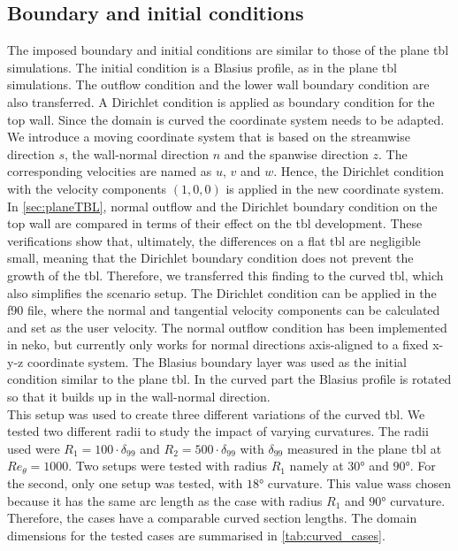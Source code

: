 \subsection{Boundary and initial conditions}
The imposed boundary and initial conditions are similar to those of the plane \acrshort{tbl} simulations.
The initial condition is  a Blasius profile, as in the plane \acrshort{tbl} simulations.
The outflow condition and the lower wall boundary condition  are also transferred.
A Dirichlet condition is applied as boundary condition for the top wall.
Since the domain is curved the coordinate system needs to be adapted.
We introduce a moving coordinate system that is based on the streamwise direction $s$, the wall-normal direction $n$ and the spanwise direction $z$.
The corresponding velocities are named as $u$, $v$ and $w$.
Hence, the Dirichlet condition with the velocity components $(1,0,0)$ is applied in the new coordinate system.
In \autoref{sec:planeTBL}, normal outflow and the Dirichlet  boundary condition on the top wall are compared  in terms of their effect on the \acrshort{tbl} development.
These verifications show that, ultimately, the differences  on a flat \acrshort{tbl} are negligible small, meaning that the Dirichlet boundary condition does not prevent the growth of the \acrshort{tbl}.
Therefore, we transferred this finding to the curved \acrshort{tbl}, which also simplifies the scenario setup.
The Dirichlet condition can be applied in the f90 file, where the normal and tangential velocity components can be calculated and set as the user velocity. 
The normal outflow condition has been  implemented in neko, but currently  only works for normal directions axis-aligned to a fixed x-y-z coordinate system. 
 The Blasius boundary layer was used as the initial condition similar to the plane \acrshort{tbl}.
In the curved part the Blasius profile is rotated so that it builds up in the wall-normal direction. \\



This setup was used to create three different variations of the curved \acrshort{tbl}.
We tested two different radii to study the impact of varying curvatures. 
The radii used were  $R_1 = 100 \cdot \delta_{99}$ and $R_2 = 500 \cdot \delta_{99}$ with $\delta_{99}$ measured in the plane \acrshort{tbl} at $Re_{\theta} = 1000$. 
Two setups were tested with radius $R_1$ namely at $30$° and $90$°. 
For the second, only one setup was tested, with $18$° curvature. 
This value wass chosen because it has the same arc length as the case with radius $R_1$ and $90$° curvature. 
Therefore, the cases have a comparable curved section lengths.
The domain dimensions for the tested cases are summarised in \autoref{tab:curved_cases}.


